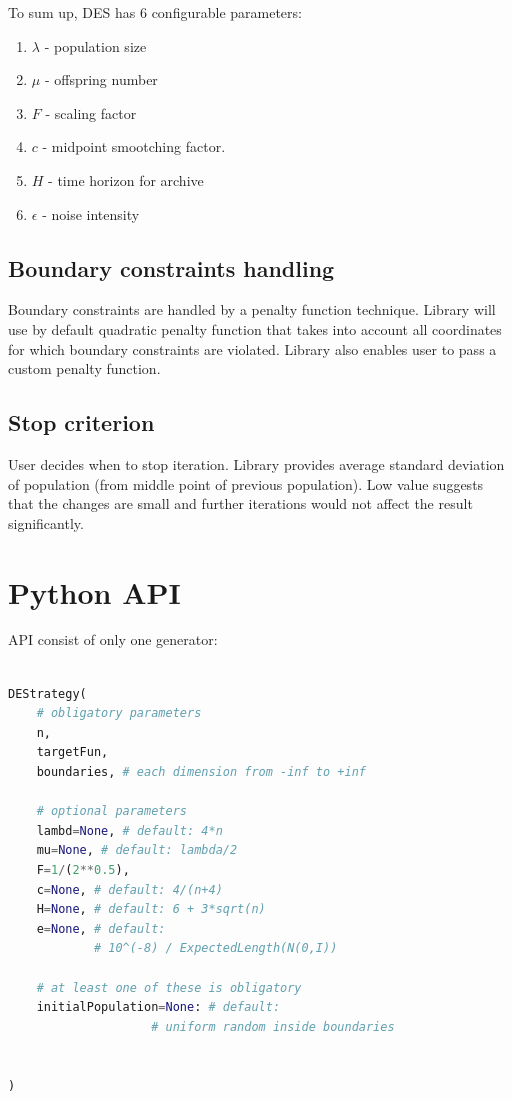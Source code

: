 \documentclass[11pt,a4paper]{article}
\begin{document}
To sum up, DES has 6 configurable parameters:
\begin{enumerate}
\item $\lambda$ - population size
\item $\mu$ - offspring number
\item $F$ - scaling factor
\item $c$ - midpoint smootching factor.
\item $H$ - time horizon for archive
\item $\epsilon$ - noise intensity
\end{enumerate}

\subsection{Boundary constraints handling}\label{subsec:constraints}

Boundary constraints are handled by a penalty function technique.
Library will use by default quadratic penalty function that takes into account all coordinates for which boundary constraints are violated.
Library also enables user to pass a custom penalty function.

\subsection{Stop criterion}\label{subsec:stop}
User decides when to stop iteration.
Library provides average standard deviation of population (from middle point of previous population).
Low value suggests that the changes are small and further iterations would not affect the result significantly.

\section{Python API}\label{sec:api}
API consist of only one generator:


\begin{lstlisting}[language=Python]

DEStrategy(
    # obligatory parameters
    n,
    targetFun,
    boundaries, # each dimension from -inf to +inf

    # optional parameters
    lambd=None, # default: 4*n
    mu=None, # default: lambda/2
    F=1/(2**0.5),
    c=None, # default: 4/(n+4)
    H=None, # default: 6 + 3*sqrt(n)
    e=None, # default:
            # 10^(-8) / ExpectedLength(N(0,I))

    # at least one of these is obligatory
    initialPopulation=None: # default:
                    # uniform random inside boundaries


)

\end{lstlisting}
\end{document}
